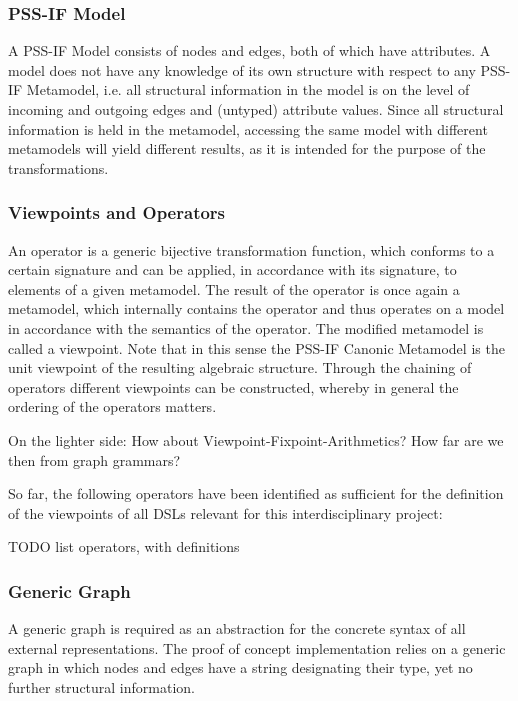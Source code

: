 \subsubsection{PSS-IF Model}

A PSS-IF Model consists of nodes and edges, both of which have attributes. A model does not have any knowledge of its own structure with respect to any PSS-IF Metamodel, i.e. all structural information in the model is on the level of incoming and outgoing edges and (untyped) attribute values. Since all structural information is held in the metamodel, accessing the same model with different metamodels will yield different results, as it is intended for the purpose of the transformations.

\subsubsection{Viewpoints and Operators}

An operator is a generic bijective transformation function, which conforms to a certain signature and can be applied, in accordance with its signature, to elements of a given metamodel. The result of the operator is once again a metamodel, which internally contains the operator and thus operates on a model in accordance with the semantics of the operator. The modified metamodel is called a viewpoint. Note that in this sense the PSS-IF Canonic Metamodel is the unit viewpoint of the resulting algebraic structure. Through the chaining of operators different viewpoints can be constructed, whereby in general the ordering of the operators matters. 

\color{red}
On the lighter side: How about Viewpoint-Fixpoint-Arithmetics? How far are we then from graph grammars?
\color{black}

So far, the following operators have been identified as sufficient for the definition of the viewpoints of all DSLs relevant for this interdisciplinary project:

\color{red}
TODO list operators, with definitions
\color{black}

\subsubsection{Generic Graph}

A generic graph is required as an abstraction for the concrete syntax of all external representations. The proof of concept implementation relies on a generic graph in which nodes and edges have a string designating their type, yet no further structural information.

